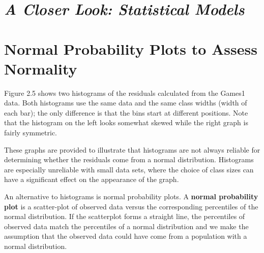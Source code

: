 \documentclass[
]{report}
\begin{document}
\section*{\texorpdfstring{\emph{A Closer Look: Statistical Models}}{A Closer Look: Statistical Models}}\label{a-closer-look-statistical-models}

\section{\texorpdfstring{\textbf{Normal Probability Plots to Assess Normality}}{Normal Probability Plots to Assess Normality}}\label{normal-probability-plots-to-assess-normality}

Figure 2.5 shows two histograms of the residuals calculated from the Games1 data. Both histograms use the same data and the same class widths (width of each bar); the only difference is that the bins start at different positions. Note that the histogram on the left looks somewhat skewed while the right graph is fairly symmetric.

These graphs are provided to illustrate that histograms are not always reliable for determining whether the residuals come from a normal distribution. Histograms are especially unreliable with small data sets, where the choice of class sizes can have a significant effect on the appearance of the graph.

An alternative to histograms is normal probability plots. A \textbf{normal probability plot} is a scatter-plot of observed data versus the corresponding percentiles of the normal distribution. If the scatterplot forms a straight line, the percentiles of observed data match the percentiles of a normal distribution and we make the assumption that the observed data could have come from a population with a normal distribution.
\end{document}
